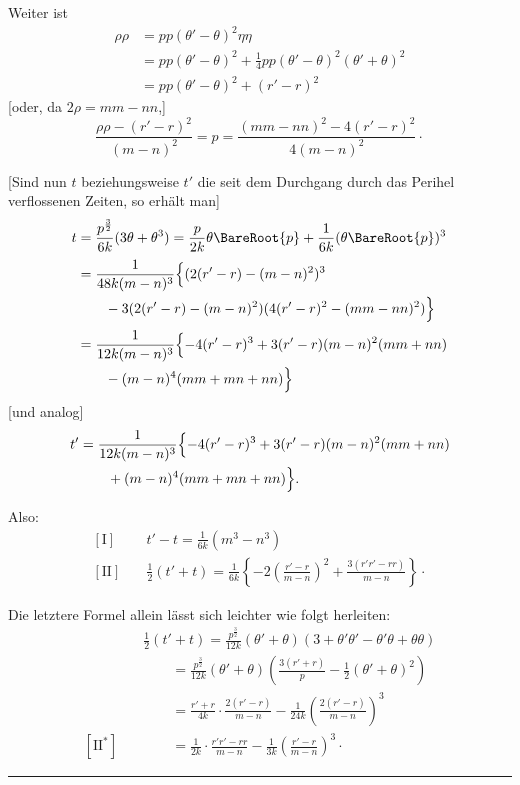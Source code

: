 Weiter ist
\[
\begin{aligned}
\rho\rho&=pp(\theta'-\theta)^2\eta\eta\\
&=pp(\theta'-\theta)^2+\tfrac{1}{4}pp(\theta'-\theta)^2(\theta'+\theta)^2\\
&=pp(\theta'-\theta)^2+(r'-r)^2
\end{aligned}
\]
[oder, da \(2\rho=mm-nn\),]
\[
\frac{\rho\rho-(r'-r)^2}{(m-n)^2}=p=\frac{(mm-nn)^2-4(r'-r)^2}{4(m-n)^2}\mathpunct{\cdot}
\]

[Sind nun \(t\) beziehungsweise \(t'\) die seit dem Durchgang durch das Perihel verflossenen Zeiten, so erhält man]
\[
\begin{aligned}
t&=\frac{p^{\frac{3}{2}}}{6k}(3\theta+\theta^3)=\frac{p}{2k}\theta\BareRoot{p}+\frac{1}{6k}(\theta\BareRoot{p})^3\\[.5ex]
&=\frac{1}{48k(m-n)^3}\Bigl\{(2(r'-r)-(m-n)^2)^3\\
&\qquad-3(2(r'-r)-(m-n)^2)(4(r'-r)^2-(mm-nn)^2)\Bigr\}\\[.5ex]
&=\frac{1}{12k(m-n)^3}\Bigl\{-4(r'-r)^3+3(r'-r)(m-n)^2(mm+nn)\\
&\qquad-(m-n)^4(mm+mn+nn)\Bigr\}
\end{aligned}
\]
[und analog]
\[
\begin{aligned}
t'&=\frac{1}{12k(m-n)^3}\Bigl\{-4(r'-r)^3+3(r'-r)(m-n)^2(mm+nn)\\
&\qquad+(m-n)^4(mm+mn+nn)\Bigr\}.
\end{aligned}
\]

Also:
\[
\begin{aligned}
\mathrm{[I]}\quad&t'-t=\frac{1}{6k}(m^3-n^3)\\[1ex]
\mathrm{[II]}\quad&\tfrac{1}{2}(t'+t)=\frac{1}{6k}\left\{-2\left(\frac{r'-r}{m-n}\right)^2+\frac{3(r'r'-rr)}{m-n}\right\}\mathpunct{\cdot}
\end{aligned}
\]

Die letztere Formel allein lässt sich leichter wie folgt herleiten:
\[
\begin{aligned}
&\tfrac{1}{2}(t'+t)=\frac{p^{\frac{3}{2}}}{12k}(\theta'+\theta)(3+\theta'\theta'-\theta'\theta+\theta\theta)\\
&\qquad=\frac{p^{\frac{3}{2}}}{12k}(\theta'+\theta)\left(\frac{3(r'+r)}{p}-\tfrac{1}{2}(\theta'+\theta)^2\right)\\[.5ex]
&\qquad=\frac{r'+r}{4k}\cdot\frac{2(r'-r)}{m-n}-\frac{1}{24k}\left(\frac{2(r'-r)}{m-n}\right)^3\\[.5ex]
\mathrm{[II^{*}]}\quad&\qquad=\frac{1}{2k}\cdot\frac{r'r'-rr}{m-n}-\frac{1}{3k}\left(\frac{r'-r}{m-n}\right)^3\mathpunct{\cdot}
\end{aligned}
\]
\begin{center}\rule{.3\linewidth}{.4pt}\end{center}
